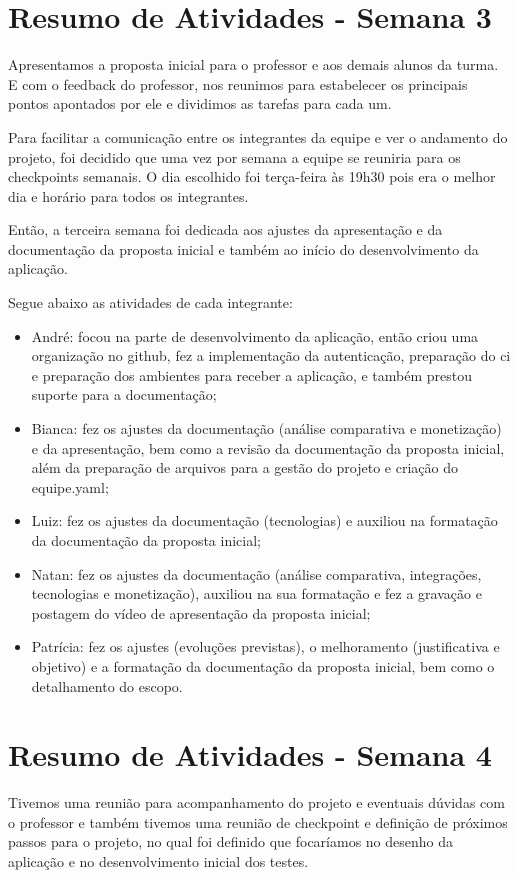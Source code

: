 \begin{apendicesenv}
\section{Resumo de Atividades - Semana 3}
Apresentamos a proposta inicial para o professor e aos demais alunos da turma. E com o \gls{feedback} do professor, nos reunimos para estabelecer os principais pontos apontados por ele e dividimos as tarefas para cada um.

Para facilitar a comunicação entre os integrantes da equipe e ver o andamento do projeto, foi decidido que uma vez por semana a equipe se reuniria para os \glspl{checkpoint} semanais. O dia escolhido foi terça-feira às 19h30 pois era o melhor dia e horário para todos os integrantes. 

Então, a terceira semana foi dedicada aos ajustes da apresentação e da documentação da proposta inicial e também ao início do desenvolvimento da aplicação.

Segue abaixo as atividades de cada integrante:

\begin{itemize}
\item André: focou na parte de desenvolvimento da aplicação, então criou uma organização no \gls{github}, fez a implementação da autenticação, preparação do \ac{ci} e preparação dos ambientes para receber a aplicação, e também prestou suporte para a documentação;
\item Bianca: fez os ajustes da documentação (análise comparativa e monetização) e da apresentação, bem como a revisão da documentação da proposta inicial, além da preparação de arquivos para a gestão do projeto e criação do equipe.yaml;
\item Luiz: fez os ajustes da documentação (tecnologias) e auxiliou na formatação da documentação da proposta inicial;
\item Natan: fez os ajustes da documentação (análise comparativa, integrações, tecnologias e monetização), auxiliou na sua formatação e fez a gravação e postagem do vídeo de apresentação da proposta inicial;
\item Patrícia: fez os ajustes (evoluções previstas), o melhoramento (justificativa e objetivo) e a formatação da documentação da proposta inicial, bem como o detalhamento do escopo.
\end{itemize}

\section{Resumo de Atividades - Semana 4}
Tivemos uma reunião para acompanhamento do projeto e eventuais dúvidas com o professor e também tivemos uma reunião de \gls{checkpoint} e definição de próximos passos para o projeto, no qual foi definido que focaríamos no desenho da aplicação e no desenvolvimento inicial dos testes.


\end{apendicesenv}

